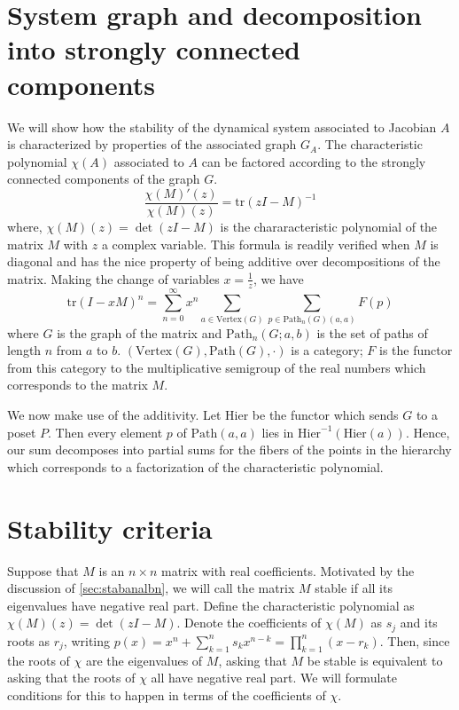 \documentclass{amsart}
\theoremstyle{definition}
\theoremstyle{remark}
\numberwithin{equation}{section}
\def\tr{\mathrm{tr}}
\def\Path{\mathrm{Path}}
\def\hier{\mathrm{Hier}}
\def\Vertex{\mathrm{Vertex}}
\begin{document}
\section{System graph and decomposition into strongly connected components}
We will show how the stability of the dynamical system associated to Jacobian $A$ is characterized by properties of the associated graph $G_A$. The characteristic polynomial $\chi(A)$ associated to $A$ can be factored according to the strongly connected components of the graph $G$. $$\frac{\chi(M)'(z)}{\chi(M)(z)} = \tr (zI - M)^{-1}$$ where, $\chi(M)(z) = \det (zI - M)$ is the chararacteristic polynomial of the matrix $M$ with $z$ a complex variable.  This formula is readily verified when $M$ is diagonal and has the nice property of being additive over decompositions of the matrix. Making the change of variables $x=\frac{1}{z}$, we have $$\tr (I - xM)^n = \sum_{n=0}^\infty x^n \sum_{a \in \Vertex(G)} \sum_{p \in \Path_n (G)(a,a)} F(p)$$
where $G$ is the graph of the matrix and $\Path_n (G;a,b)$ is the set of
paths of length $n$ from $a$ to $b$.  $(\Vertex(G), \Path(G), \cdot)$ is a category; $F$ is the functor from this category to the multiplicative semigroup of the real numbers which corresponds to the matrix $M$.

We now make use of the additivity.  Let $\hier$ be the functor which
sends $G$ to a poset $P$.  Then every element $p$ of $\Path(a,a)$ lies
in $\hier^{-1} (\hier(a))$.  Hence, our sum decomposes into partial sums
for the fibers of the points in the hierarchy which corresponds to a
factorization of the characteristic polynomial.


\section{Stability criteria}
Suppose that $M$ is an $n \times n$ matrix with real coefficients. Motivated by the discussion of \ref{sec:stabanalbn}, we will call the matrix $M$ stable if all its eigenvalues have negative real part.  Define the characteristic polynomial as $\chi(M)(z) = \det(zI - M)$. Denote the coefficients of $\chi(M)$ as $s_j$ and its roots as $r_j$, writing $p(x) = x^n + \sum_{k=1}^n s_k x^{n-k} = \prod_{k=1}^n (x-r_k)$.  Then, since the roots of $\chi$ are the eigenvalues of $M$, asking that $M$ be stable is equivalent to asking that the roots of $\chi$ all have negative real part.  We will formulate conditions for this to happen in terms of the coefficients of $\chi$.
\end{document}
